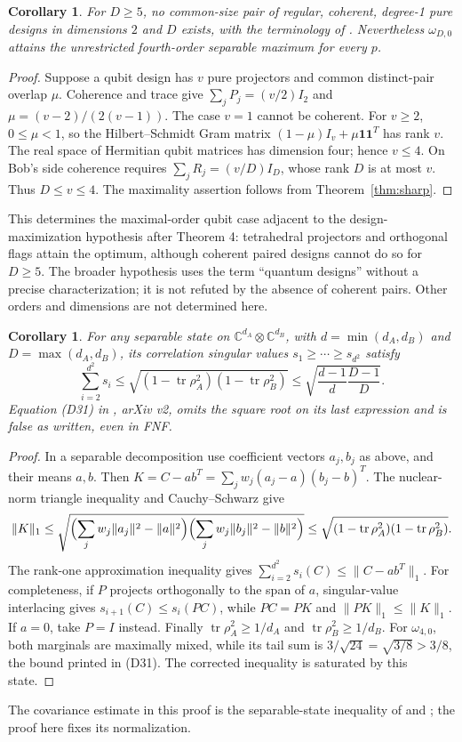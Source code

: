 \documentclass[11pt]{article}
\newtheorem{corollary}[theorem]{Corollary}
\newcommand{\tr}{\operatorname{tr}}
\begin{document}
\begin{corollary}\label{cor:design}
For $D\ge5$, no common-size pair of regular, coherent, degree-1 pure
designs in dimensions $2$ and $D$ exists, with the terminology of
\cite[Section IV]{peled}. Nevertheless $\omega_{D,0}$ attains the
unrestricted fourth-order separable maximum for every $p$.
\end{corollary}
\begin{proof}
Suppose a qubit design has $v$ pure projectors and common distinct-pair
overlap $\mu$. Coherence and trace give
$\sum_jP_j=(v/2)I_2$ and $\mu=(v-2)/(2(v-1))$.
The case $v=1$ cannot be coherent. For $v\ge2$, $0\le\mu<1$, so the
Hilbert--Schmidt Gram matrix $(1-\mu)I_v+\mu\mathbf1\mathbf1^T$
has rank $v$. The real space of Hermitian qubit matrices has dimension
four; hence $v\le4$. On Bob's side coherence requires
$\sum_jR_j=(v/D)I_D$, whose rank $D$ is at most $v$. Thus $D\le v\le4$.
The maximality assertion follows from Theorem~\ref{thm:sharp}.
\end{proof}
This determines the maximal-order qubit case adjacent to the
design-maximization hypothesis after Theorem 4: tetrahedral projectors
and orthogonal flags attain the optimum, although coherent paired designs
cannot do so for $D\ge5$. The broader hypothesis uses the term
``quantum designs'' without a precise characterization; it is not refuted
by the absence of coherent pairs. Other orders and dimensions are not determined here.

\begin{corollary}\label{cor:tail}
For any separable state on $\mathbb C^{d_A}\otimes\mathbb C^{d_B}$,
with $d=\min(d_A,d_B)$ and $D=\max(d_A,d_B)$, its correlation singular
values $s_1\ge\cdots\ge s_{d^2}$ satisfy
\[
 \sum_{i=2}^{d^2}s_i
 \le\sqrt{(1-\tr\rho_A^2)(1-\tr\rho_B^2)}
 \le\sqrt{\frac{d-1}{d}\frac{D-1}{D}}.
\]
Equation (D31) in \cite{peled}, arXiv v2, omits the square root on
its last expression and is false as written, even in FNF.
\end{corollary}
\begin{proof}
In a separable decomposition use coefficient vectors $a_j,b_j$ as above,
and their means $a,b$. Then
$K=C-ab^T=\sum_jw_j(a_j-a)(b_j-b)^T$.
The nuclear-norm triangle inequality and Cauchy--Schwarz give
\[
 \|K\|_1\le
 \sqrt{\Bigl(\sum_jw_j\|a_j\|^2-\|a\|^2\Bigr)
             \Bigl(\sum_jw_j\|b_j\|^2-\|b\|^2\Bigr)}
 \le\sqrt{(1-\tr\rho_A^2)(1-\tr\rho_B^2)}.
\]
The rank-one approximation inequality gives
$\sum_{i=2}^{d^2}s_i(C)\le\|C-ab^T\|_1$.
For completeness, if $P$ projects orthogonally to the span of $a$,
singular-value interlacing gives $s_{i+1}(C)\le s_i(PC)$, while
$PC=PK$ and $\|PK\|_1\le\|K\|_1$.
If $a=0$, take $P=I$ instead. Finally $\tr\rho_A^2\ge1/d_A$ and
$\tr\rho_B^2\ge1/d_B$.
For $\omega_{4,0}$, both marginals are maximally mixed, while its
tail sum is $3/\sqrt{24}=\sqrt{3/8}>3/8$, the bound printed in (D31).
The corrected inequality is saturated by this state.
\end{proof}
The covariance estimate in this proof is the separable-state inequality
of \cite[Theorem 1]{zhang} and \cite[Proposition IV.2]{covariance};
the proof here fixes its normalization.
\end{document}
